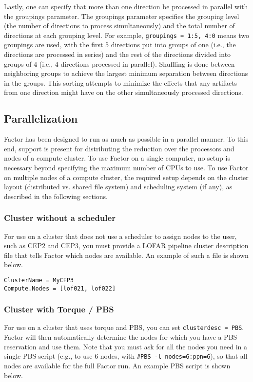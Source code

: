 \documentclass[structabstract]{article}
\begin{document}
Lastly, one can specify that more than one direction be processed in parallel
with the groupings parameter. The groupings parameter specifies the grouping
level (the number of directions to process simultaneously) and the total number
of directions at each grouping level. For example, {\tt groupings = 1:5, 4:0}
means two groupings are used, with the first 5 directions put into groups of one
(i.e., the directions are processed in series) and the rest of the directions
divided into groups of 4 (i.e., 4 directions processed in parallel). Shuffling
is done between neighboring groups to achieve the largest minimum separation
between directions in the groups. This sorting attempts to minimize the effects
that any artifacts from one direction might have on the other simultaneously
processed directions.


\subsection{Parallelization}
\label{factor:parallel}

Factor has been designed to run as much as possible in a parallel manner. To
this end, support is present for distributing the reduction over the processors
and nodes of a compute cluster. To use Factor on a single computer, no setup is
necessary beyond specifying the maximum number of CPUs to use. To use Factor on
multiple nodes of a compute cluster, the required setup depends on the cluster
layout (distributed vs. shared file system) and scheduling system (if any), as
described in the following sections.

\subsubsection{Cluster without a scheduler}
For use on a cluster that does not use a scheduler to assign nodes to the user,
such as CEP2 and CEP3, you must provide a LOFAR pipeline cluster description
file that tells Factor which nodes are available. An example of such a file is
shown below.

\begin{verbatim}
ClusterName = MyCEP3
Compute.Nodes = [lof021, lof022]
\end{verbatim}

\subsubsection{Cluster with Torque / PBS }
For use on a cluster that uses torque and PBS, you can set {\tt clusterdesc =
PBS}. Factor will then automatically determine the nodes for which you have a
PBS reservation and use them. Note that you must ask for all the nodes you need
in a single PBS script (e.g., to use 6 nodes, with {\tt \#PBS -l
nodes=6:ppn=6}), so that all nodes are available for the full Factor run. An
example PBS script is shown below.
\end{document}

